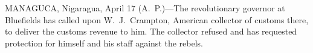 
MANAGUCA, Nigaragua, April 17 (A.~P.)---The revolutionary governor at
Bluefields has called upon W.~J.~Crampton, American collector of
customs there, to deliver the customs revenue to him.  The collector
refused and has requested protection for himself and his staff against
the rebels.

